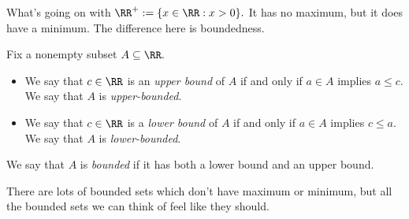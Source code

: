 \documentclass[../notes.tex]{subfiles}
\begin{document}
What's going on with $\RR^+:=\{x\in\RR:x>0\}.$ It has no maximum, but it does have a minimum. The difference here is boundedness.
\begin{defi}[Boundedness]
	Fix a nonempty subset $A\subseteq\RR.$
	\begin{itemize}
		\item We say that $c\in\RR$ is an \textit{upper bound} of $A$ if and only if $a\in A$ implies $a\le c.$ We say that $A$ is \textit{upper-bounded}.
		\item We say that $c\in\RR$ is a \textit{lower bound} of $A$ if and only if $a\in A$ implies $c\le a.$ We say that $A$ is \textit{lower-bounded}.
	\end{itemize}
	We say that $A$ is \textit{bounded} if it has both a lower bound and an upper bound.
\end{defi}
There are lots of bounded sets which don't have maximum or minimum, but all the bounded sets we can think of feel like they should.
\end{document}
